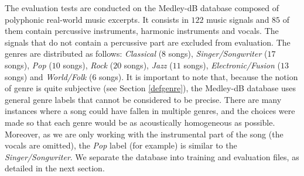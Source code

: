 \documentclass{article}
\begin{document}
The evaluation tests are conducted on the Medley-dB database \cite{bittner2014medleydb} composed of polyphonic real-world music excerpts. It consists in $122$ music signals and $85$ of them contain percussive instruments, harmonic instruments and vocals. The signals that do not contain a percussive part are excluded from evaluation. The genres are distributed as follows: \emph{Classical} ($8$ songs), \emph{Singer/Songwriter} ($17$ songs), \emph{Pop} ($10$ songs), \emph{Rock} ($20$ songs), \emph{Jazz} ($11$ songs), \emph{Electronic/Fusion} ($13$ songs) and \emph{World/Folk} ($6$ songs). It is important to note that, because the notion of genre is quite subjective (see Section \ref{defgenre}), the Medley-dB database uses general genre labels that cannot be considered to be precise. There are many instances where a song could have fallen in multiple genres, and the choices were made so that each genre would be as acoustically homogeneous as possible. Moreover, as we are only working with the instrumental part of the song (the vocals are omitted), the \emph{Pop} label (for example) is similar to the \emph{Singer/Songwriter}. We separate the database into training and evaluation files, as detailed in the next section. 
\end{document}
